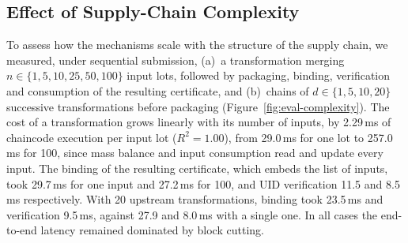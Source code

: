 \subsection{Effect of Supply-Chain Complexity}
\label{sec:eval-complexity}

To assess how the mechanisms scale with the structure of the supply chain, we measured, under sequential submission,
(a)~a transformation merging $n \in \{1, 5, 10, 25, 50, 100\}$ input lots, followed by packaging, binding, verification and
consumption of the resulting certificate, and (b)~chains of $d \in \{1, 5, 10, 20\}$ successive transformations
before packaging (Figure~\ref{fig:eval-complexity}). The cost of a transformation grows linearly with its number of inputs, by 2.29\,ms of chaincode execution
per input lot ($R^2 = 1.00$), from 29.0\,ms for one lot to 257.0\,ms for 100, since mass
balance and input consumption read and update every input. The binding of the resulting certificate, which embeds the list of inputs,
took 29.7\,ms for one input and 27.2\,ms for 100, and UID verification 11.5 and
8.5\,ms respectively.  With 20 upstream transformations, binding took 23.5\,ms and verification 9.5\,ms, against
27.9 and 8.0\,ms with a single one. In all cases the end-to-end latency
remained dominated by block cutting.

